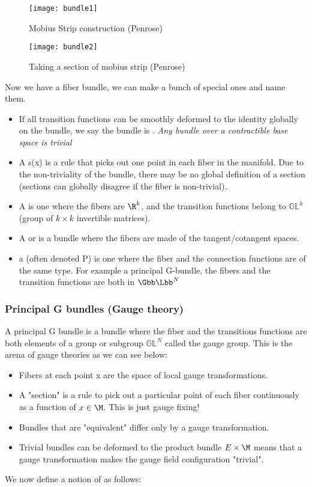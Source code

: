 \documentclass[11pt]{scrartcl}
\begin{document}
\begin{figure}[h!]
	\caption{Mobius Strip construction (Penrose)}
	\texttt{[image: bundle1]}
\end{figure}

\begin{figure}[h!]
	\caption{Taking a section of mobius strip (Penrose)}
	\texttt{[image: bundle2]}
\end{figure}

Now we have a fiber bundle, we can make a bunch of special ones and name them.
\begin{itemize}
	\item If all transition functions can be smoothly deformed to the identity globally on the bundle, we say the bundle is .
	\emph{Any bundle over a contractible base space is trivial}
	\item A  s(x) is a rule that picks out one point in each fiber in the manifold.  Due to the non-triviality of the bundle, there may be no global definition of a section (sections can globally disagree if the fiber is non-trivial).
	\item A  is one where the fibers are $\R^k$, and the transition functions belong to $\mathbb{GL}^k$ (group of $k \times k$ invertible matrices).
	\item A  or  is a bundle where the fibers are made of the tangent/cotangent spaces.
	\item a  (often denoted P) is one where the fiber and the connection functions are of the same type.  For example a principal G-bundle, the fibers and the transition functions are both in $\Gbb \Lbb^N$
\end{itemize} 

\subsubsection{Principal G bundles (Gauge theory)}

A principal G bundle is a bundle where the fiber and the transitions functions are both elements of a group or subgroup  $\mathbb{GL}^N$ called the gauge group.
This is the arena of gauge theories as we can see below:
\begin{itemize}
	\item Fibers at each point x are the space of local gauge transformations.
	\item A "section" is a rule to pick out a particular point of each fiber continuously as a function of $x \in \M$.  This is just gauge fixing!
	\item Bundles that are "equivalent" differ only by a gauge transformation.
	\item Trivial bundles can be deformed to the product bundle $E \times \M$ means that a gauge transformation makes the gauge field configuration "trivial".
	\end{itemize}
We now define a notion of  as follows:
\end{document}
